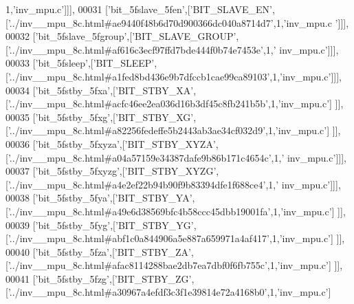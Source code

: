 \begin{DoxyCode}
      1,\textcolor{stringliteral}{'inv\_mpu.c'}]]],
00031   [\textcolor{stringliteral}{'bit\_5fslave\_5fen'},[\textcolor{stringliteral}{'BIT\_SLAVE\_EN'},[\textcolor{stringliteral}{'../inv\_\_mpu\_8c.html#ae9440f48b6d70d900366dc040a8714d7'},1,\textcolor{stringliteral}{'inv\_mpu.c
      '}]]],
00032   [\textcolor{stringliteral}{'bit\_5fslave\_5fgroup'},[\textcolor{stringliteral}{'BIT\_SLAVE\_GROUP'},[\textcolor{stringliteral}{'../inv\_\_mpu\_8c.html#af616c3ecf97ffd7bde444f0b74e7453e'},1,\textcolor{stringliteral}{'
      inv\_mpu.c'}]]],
00033   [\textcolor{stringliteral}{'bit\_5fsleep'},[\textcolor{stringliteral}{'BIT\_SLEEP'},[\textcolor{stringliteral}{'../inv\_\_mpu\_8c.html#a1fed8bd436e9b7dfccb1cae99ca89103'},1,\textcolor{stringliteral}{'inv\_mpu.c'}]]],
00034   [\textcolor{stringliteral}{'bit\_5fstby\_5fxa'},[\textcolor{stringliteral}{'BIT\_STBY\_XA'},[\textcolor{stringliteral}{'../inv\_\_mpu\_8c.html#acfc46ee2ea036d16b3df45c8fb241b5b'},1,\textcolor{stringliteral}{'inv\_mpu.c'}]
      ]],
00035   [\textcolor{stringliteral}{'bit\_5fstby\_5fxg'},[\textcolor{stringliteral}{'BIT\_STBY\_XG'},[\textcolor{stringliteral}{'../inv\_\_mpu\_8c.html#a82256fedeffe5b2443ab3ae34cf032d9'},1,\textcolor{stringliteral}{'inv\_mpu.c'}]
      ]],
00036   [\textcolor{stringliteral}{'bit\_5fstby\_5fxyza'},[\textcolor{stringliteral}{'BIT\_STBY\_XYZA'},[\textcolor{stringliteral}{'../inv\_\_mpu\_8c.html#a04a57159e34387dafe9b86b171c4654c'},1,\textcolor{stringliteral}{'
      inv\_mpu.c'}]]],
00037   [\textcolor{stringliteral}{'bit\_5fstby\_5fxyzg'},[\textcolor{stringliteral}{'BIT\_STBY\_XYZG'},[\textcolor{stringliteral}{'../inv\_\_mpu\_8c.html#a4e2ef22b94b90f9b83394dfe1f688ce4'},1,\textcolor{stringliteral}{'
      inv\_mpu.c'}]]],
00038   [\textcolor{stringliteral}{'bit\_5fstby\_5fya'},[\textcolor{stringliteral}{'BIT\_STBY\_YA'},[\textcolor{stringliteral}{'../inv\_\_mpu\_8c.html#a49e6d38569bfc4b58ccc45dbb19001fa'},1,\textcolor{stringliteral}{'inv\_mpu.c'}]
      ]],
00039   [\textcolor{stringliteral}{'bit\_5fstby\_5fyg'},[\textcolor{stringliteral}{'BIT\_STBY\_YG'},[\textcolor{stringliteral}{'../inv\_\_mpu\_8c.html#abf1c0a844906a5e887a659971a4af417'},1,\textcolor{stringliteral}{'inv\_mpu.c'}]
      ]],
00040   [\textcolor{stringliteral}{'bit\_5fstby\_5fza'},[\textcolor{stringliteral}{'BIT\_STBY\_ZA'},[\textcolor{stringliteral}{'../inv\_\_mpu\_8c.html#afac8114288bae2db7ea7dbf0f6fb755c'},1,\textcolor{stringliteral}{'inv\_mpu.c'}]
      ]],
00041   [\textcolor{stringliteral}{'bit\_5fstby\_5fzg'},[\textcolor{stringliteral}{'BIT\_STBY\_ZG'},[\textcolor{stringliteral}{'../inv\_\_mpu\_8c.html#a30967a4efdf3c3f1e39814e72a4168b0'},1,\textcolor{stringliteral}{'inv\_mpu.c'}]

\end{DoxyCode}
